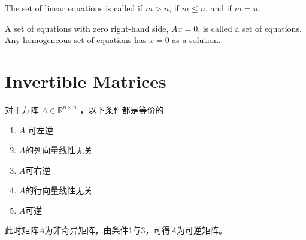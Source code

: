     The set
    of linear equations is called  if $ m>n $,   if $m \leq n$, and  if $m = n$.

    A set of equations with zero right-hand side, $ A x=0 $, is called a  set of equations. Any homogeneous set of equations has $ x=0 $ as a solution.

\section{Invertible Matrices}

\begin{theorem}
    对于方阵 $ A \in \mathbb{R}^{n \times n} $ ，以下条件都是等价的:

    \begin{enumerate}
        \item $ A $ 可左逆
        \item $A$的列向量线性无关
        \item $A$可右逆
        \item $A$的行向量线性无关
        \item $A$可逆
    \end{enumerate}

    此时矩阵$A$为非奇异矩阵，由条件1与3，可得$A$为可逆矩阵。 
\end{theorem}

